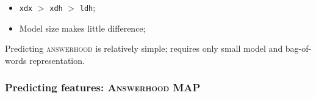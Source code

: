 \documentclass[xcolor={dvipsnames}]{beamer}
\newcommand{\feat}[1]{\textsc{#1}}
\newcommand{\param}[1]{\texttt{#1}}
\begin{document}
\begin{frame}
\begin{itemize}
\pause
\item \param{xdx} $>$ \param{xdh} $>$ \param{ldh};
\pause
\item Model size makes little difference;
\end{itemize}

Predicting \feat{answerhood} is relatively simple; requires only small model and bag-of-words representation.

\end{frame}



\begin{frame}
\frametitle{Predicting features: \feat{Answerhood} MAP}

\small


\end{frame}
\end{document}
